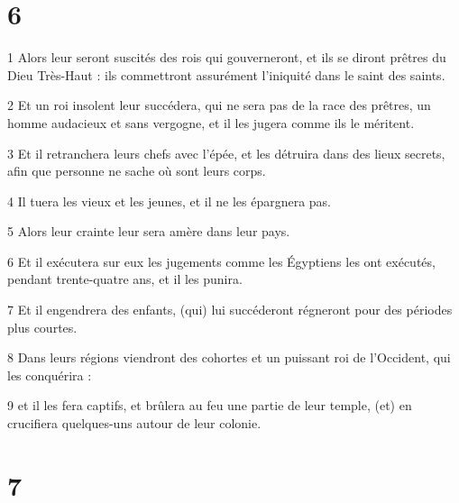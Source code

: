 \chapter{6}

\par 1 Alors leur seront suscités des rois qui gouverneront, et ils se diront prêtres du Dieu Très-Haut : ils commettront assurément l'iniquité dans le saint des saints.
\par 2 Et un roi insolent leur succédera, qui ne sera pas de la race des prêtres, un homme audacieux et sans vergogne, et il les jugera comme ils le méritent.
\par 3 Et il retranchera leurs chefs avec l'épée, et les détruira dans des lieux secrets, afin que personne ne sache où sont leurs corps.
\par 4 Il tuera les vieux et les jeunes, et il ne les épargnera pas.
\par 5 Alors leur crainte leur sera amère dans leur pays.
\par 6 Et il exécutera sur eux les jugements comme les Égyptiens les ont exécutés, pendant trente-quatre ans, et il les punira.
\par 7 Et il engendrera des enfants, (qui) lui succéderont régneront pour des périodes plus courtes.
\par 8 Dans leurs régions viendront des cohortes et un puissant roi de l'Occident, qui les conquérira :
\par 9 et il les fera captifs, et brûlera au feu une partie de leur temple, (et) en crucifiera quelques-uns autour de leur colonie.

\chapter{7}


